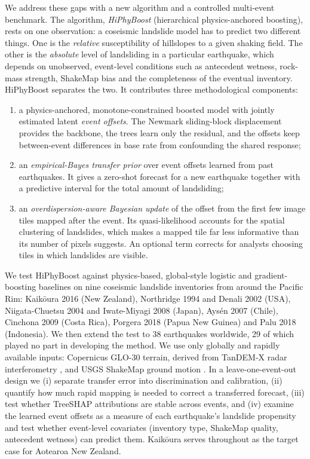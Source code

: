 We address these gaps with a new algorithm and a controlled multi-event benchmark. The algorithm, \emph{HiPhyBoost} (hierarchical physics-anchored boosting), rests on one observation: a coseismic landslide model has to predict two different things. One is the \emph{relative} susceptibility of hillslopes to a given shaking field. The other is the \emph{absolute} level of landsliding in a particular earthquake, which depends on unobserved, event-level conditions such as antecedent wetness, rock-mass strength, ShakeMap bias and the completeness of the eventual inventory. HiPhyBoost separates the two. It contributes three methodological components:
\begin{enumerate}
\item a physics-anchored, monotone-constrained boosted model with jointly estimated latent \emph{event offsets}. The Newmark sliding-block displacement provides the backbone, the trees learn only the residual, and the offsets keep between-event differences in base rate from confounding the shared response;
\item an \emph{empirical-Bayes transfer prior} over event offsets learned from past earthquakes. It gives a zero-shot forecast for a new earthquake together with a predictive interval for the total amount of landsliding;
\item an \emph{overdispersion-aware Bayesian update} of the offset from the first few image tiles mapped after the event. Its quasi-likelihood accounts for the spatial clustering of landslides, which makes a mapped tile far less informative than its number of pixels suggests. An optional term corrects for analysts choosing tiles in which landslides are visible.
\end{enumerate}
We test HiPhyBoost against physics-based, global-style logistic and gradient-boosting baselines on nine coseismic landslide inventories from around the Pacific Rim: Kaik\={o}ura 2016 (New Zealand), Northridge 1994 and Denali 2002 (USA), Niigata-Chuetsu 2004 and Iwate-Miyagi 2008 (Japan), Ays\'en 2007 (Chile), Cinchona 2009 (Costa Rica), Porgera 2018 (Papua New Guinea) and Palu 2018 (Indonesia). We then extend the test to 38 earthquakes worldwide, 29 of which played no part in developing the method. We use only globally and rapidly available inputs: Copernicus GLO-30 terrain, derived from TanDEM-X radar interferometry \citep{copdem,guth2021}, and USGS ShakeMap ground motion \citep{worden2018}. In a leave-one-event-out design we (i) separate transfer error into discrimination and calibration, (ii) quantify how much rapid mapping is needed to correct a transferred forecast, (iii) test whether TreeSHAP attributions are stable across events, and (iv) examine the learned event offsets as a measure of each earthquake's landslide propensity and test whether event-level covariates (inventory type, ShakeMap quality, antecedent wetness) can predict them. Kaik\={o}ura serves throughout as the target case for Aotearoa New Zealand.
